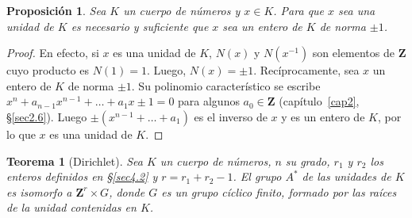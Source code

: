 \documentclass[10pt,oneside,bibtotoc,smallheadings,leqno,a5paper,DIV=12]{scrbook}
\newcommand{\ZZ}{\mathbf{Z}}
\numberwithin{equation}{section}
\theoremstyle{defi}
\theoremstyle{enonce}
\newtheorem{theorem}{Teorema}
\newtheorem{proposition}{Proposici\'on}
\theoremstyle{rem}
\numberwithin{theorem}{section}
\numberwithin{proposition}{section}
\numberwithin{definition}{section}
\numberwithin{lemma}{section}
\numberwithin{corollary}{section}
\numberwithin{example}{section}
\numberwithin{footnote}{section}%
\begin{document}
\begin{proposition}\label{prop4.4.1}
Sea $K$ un cuerpo de n\'umeros y $x\in K$. Para que $x$ sea una unidad de $K$ es
necesario y suficiente que $x$ sea un entero de $K$ de norma $\pm 1$.
\end{proposition}

\begin{proof}
En efecto, si $x$ es una unidad de $K$, $N(x)$ y $N(x^{-1})$ son elementos de $\ZZ$ cuyo producto es
$N(1) = 1$. Luego, $N(x) = \pm 1$. Rec\'iprocamente, sea $x$ un entero de $K$ de norma $\pm 1$. Su
polinomio caracter\'istico se escribe $x^{n}+a_{n-1}x^{n-1}+\dots+a_{1}x\pm 1= 0$ para algunos
$a_{0}\in\ZZ$ (cap\'itulo~\ref{cap2}, \S\ref{sec2.6}). Luego $\pm(x^{n-1}+\dots+a_{1})$ es el inverso de $x$ y es un entero de
$K$, por lo que $x$ es una unidad de $K$.
\end{proof}

\begin{theorem}[Dirichlet]\label{teo4.4.1}
Sea $K$ un cuerpo de n\'umeros, $n$ su grado, $r_{1}$ y $r_{2}$ los enteros definidos en \S\ref{sec4.2}
y $r = r_{1}+r_{2}-1$. El grupo $A^{*}$ de las unidades de $K$ es isomorfo a $\ZZ^{r}\times G$, donde
$G$ es un grupo c\'iclico finito, formado por las ra\'ices de la unidad contenidas en $K$.
\end{theorem}
\end{document}
